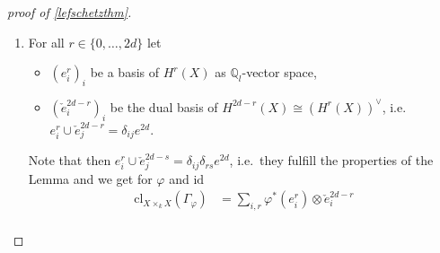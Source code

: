 \documentclass[english]{scrartcl}
\theoremstyle{definition}
\newtheorem{Lem}[Def]{Lemma}
\theoremstyle{remark}
\newcommand*{\Z}{\mathds{Z}}
\newcommand*{\Q}{\mathds{Q}}
\newcommand*{\Zl}{\Z_l} %
\newcommand*{\Ql}{\Q_l} %
\newcommand*{\End}[1]{\text{End}(#1)} %
\newcommand*{\id}{\text{id}} %
\newcommand*{\idest}{i.e.\ }
\newcommand*{\tr}[1]{\text{tr}\left(#1\right)} %
\newcommand*{\Graph}[1]{{\Gamma_{#1}}} %
\newcommand*{\cl}[2]{{\text{cl}_{#1}\left(#2\right)}} %
\newcommand*{\one}[1]{{1_{#1}}}%
\let\altphi\phi
\renewcommand*{\phi}{\varphi}
\begin{document}
\begin{proof}[proof of \autoref{lefschetzthm}]
\begin{enumerate}[label={Step \arabic*.}]
\begin{Lem}
      and $\altphi\in\End(X)$ regular.
      Write $e^{2d}\in H^{2d}(X)$ for the canonical generator
      with $\tr{e^{2d}}=1\in\Ql$.
      Furthermore, let $(b_k)_k$ be a basis of $H^*(X)$ as
      $\Ql$-vector space and $(f_k)_k$ be the dual Basis with respect
      to the cup product, \idest $b_k\cup f_l=\delta_{kl}e^{2d}$.
      Then
      \begin{gather*}
        \cl{X\times_k X}{\Graph{\phi}} =
        \sum_{k}^{2d} \phi^*(b_k)\otimes  f_k
      \end{gather*}
      \begin{proof}
        By the  %
        $H^*(X\otimes X) \cong H^*(X)\otimes_{\Ql}H^*(X)$ is a
        $H^*(X)$-module with basis
        $(\one{X}\otimes f_k)_{k}$.
        Therefore, there are unique factors $a_{k}$ in $H^*(X)$ s.t.
        \begin{gather}
          \label{eq:step2}
        \cl{X\times_k Y}{\Graph{\phi}} =
        \sum_{k} a_k\otimes f_k
      \end{gather}
      Explicitly
      \begin{align*}
        a_j
        = p_*(a_j\otimes e^{2d})
        &= p_*\Big(
          \sum_k(a_k\otimes f_k)\cup (\one{X}\otimes b_j)
        \Big)\\
        &\overset{\mathllap{\eqref{eq:step2}}}= p_*\left(
          \cl{X\times_k X}{\Graph{\phi}} \cup q^*(b_j)
          \right)\\
        &\overset{\mathllap{\ref{step1}}}= \phi^*(b_j) 
      \end{align*}
      \end{proof}
    \end{Lem}
  \item
  For all $r\in\{0,\dotsc,2d\}$ let
  \begin{itemize}
  \item $(e_i^r)_{i}$ be a basis of $H^r(X)$ as $\Ql$-vector space,
  \item $(\check e_i^{2d-r})_{i}$ be the dual basis of $H^{2d-r}(X)\cong (H^{r}(X))^\vee$,
    \idest $e^r_i\cup \check e_j^{2d-r}= \delta_{ij}e^{2d}$.
  \end{itemize}
  Note that then $e^r_i\cup \check e_j^{2d-s}=\delta_{ij}\delta_{rs}e^{2d}$,
  \idest they fulfill the properties of the Lemma
  and we get for $\phi$ and $\id$
  \begin{align*}
    \cl{X\times_k X}{\Graph{\phi}}
    &= \sum_{i,r} \phi^*(e_i^r)\otimes \check e_i^{2d-r}\\

\end{align*}
\end{enumerate}
\end{proof}
\end{document}
